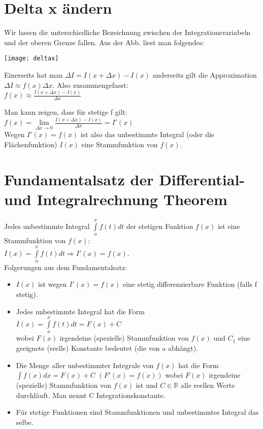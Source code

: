 \documentclass[../main.tex]{subfiles}
\begin{document}
\section{Delta x ändern}
Wir lassen die unterschiedliche Bezeichnung zwischen der Integrationsvariabeln und der 
oberen Grenze fallen. Aus der Abb. liest man folgendes: \\
\begin{minipage}{0.5\textwidth}
    \texttt{[image: deltax]}
\end{minipage} \hfill
\begin{minipage}{0.45\textwidth}
    Einerseits hat man $\Delta I = I(x+\Delta x) - I(x)$ anderseits gilt die Approximation
    $\Delta I \approx f(x)\Delta x$. Also zusammengefasst: \\ [7pt]
    $f(x) \approx \frac{I(x+\Delta x) - I(x)}{\Delta x}$
\end{minipage}
Man kann zeigen, dass für stetige f gilt: \\ [7pt]
$f(x) = \lim\limits_{\Delta x \to 0} \frac{I(x+\Delta x) - I(x)}{\Delta x} = I'(x)$ \\ [7pt]
Wegen $I'(x) = f(x)$ ist also das unbestimmte Integral (oder die Flächenfunktion) $I(x)$ eine
Stammfunktion von $f(x)$.

\section{Fundamentalsatz der Differential- und Integralrechnung Theorem}
Jedes unbestimmte Integral $\int\limits_a^x f(t)dt$ der stetigen Funktion 
$f(x)$ ist eine Stammfunktion von $f(x)$: \\ [7pt]
$I(x) = \int\limits_a^x f(t)dt \Longrightarrow I'(x) = f(x)$. \\
Folgerungen aus dem Fundamentalsatz: \\
\begin{itemize}
    \item $I(x)$ ist wegen $I'(x) = f(x)$ eine stetig differenzierbare Funktion (falls f stetig).
    \item Jedes unbestimmte Integral hat die Form \\
    $I(x) = \int\limits_a^x f(t)dt = F(x) + C$ \\
    wobei $F(x)$ irgendeine (spezielle) Stammfunktion von $f(x)$ und $C_1$ eine 
    geeignete (reelle) Konstante bedeutet (die von a abhängt).
    \item Die Menge aller unbestimmter Integrale von $f(x)$ hat die Form \\
    $\int f(x)dx = F(x) + C$    $(F'(x)=f(x))$
    wobei $F(x)$ irgendeine (spezielle) Stammfunktion von $f(x)$ ist und $C \in \mathbb{R}$ alle
    reellen Werte durchläuft. Man nennt C Integrationskonstante.
    \item Für stetige Funktionen sind Stammfunktionen und unbestimmtes Integral das selbe.
\end{itemize}
\end{document}
